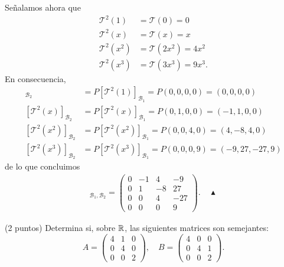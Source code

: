 \documentclass[11pt]{scrartcl}
\begin{document}
Señalamos ahora que
\begin{align*}
    \mathcal{T}^2(1) &= \mathcal{T}(0) = 0 \\
    \mathcal{T}^2(x) &= \mathcal{T}(x) = x \\
    \mathcal{T}^2(x^2) &= \mathcal{T}(2x^2) = 4x^2 \\
    \mathcal{T}^2(x^3) &= \mathcal{T}(3x^3) = 9x^3.
\end{align*}
En consecuencia,
\begin{align*}
    [\mathcal{T}^2(1)]_{\mathcal{B}_2} &= P[\mathcal{T}^2(1)]_{\mathcal{B}_1}= P(0,0,0,0) = (0,0,0,0) \\
    [\mathcal{T}^2\left(x\right)]_{\mathcal{B}_2} &= P[\mathcal{T}^2\left(x\right)]_{\mathcal{B}_1}= P(0,1,0,0) = (-1,1,0,0) \\
    [\mathcal{T}^2\left(x^2\right)]_{\mathcal{B}_2} &= P[\mathcal{T}^2\left(x^2\right)]_{\mathcal{B}_1}= P(0,0,4,0) = (4,-8,4,0) \\
    [\mathcal{T}^2\left(x^3\right)]_{\mathcal{B}_2} &= P[\mathcal{T}^2\left(x^3\right)]_{\mathcal{B}_1}= P(0,0,0,9) = (-9,27,-27,9)
\end{align*}
de lo que concluimos 
\begin{align*}
    [\mathcal{T}^2]_{\mathcal{B}_1,\mathcal{B}_2} =
    \begin{pmatrix}
        0 & -1 & 4 & -9 \\
        0 & 1 & -8 & 27 \\
        0 & 0 & 4 & -27 \\
        0 & 0 & 0 & 9
    \end{pmatrix}. \quad \blacktriangle
\end{align*}
\newpage
\begin{mdframed}[style=mdpurplebox, frametitle={Ejercicio 4, Tarea 11, Álgebra Lineal I}]
    (2 puntos) Determina si, sobre $\mathbb R$, las siguientes matrices son semejantes:
    \begin{equation*}
        A=
        \begin{pmatrix}
            4 & 1 & 0 \\
            0 & 4 & 0 \\
            0 & 0 & 2
        \end{pmatrix},
        \quad
        B=
        \begin{pmatrix}
            4 & 0 & 0 \\
            0 & 4 & 1 \\
            0 & 0 & 2            
        \end{pmatrix}.
    \end{equation*}
\end{mdframed}
\end{document}
